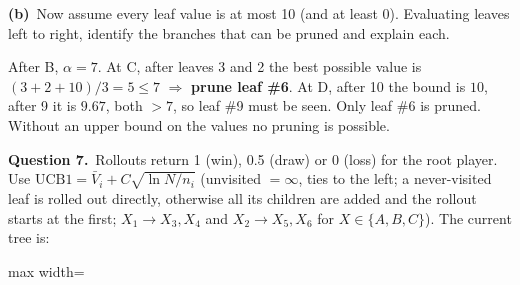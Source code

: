 \documentclass[11pt,a4paper]{article}
\newcommand{\question}[1]{\par\medskip\noindent\textbf{Question #1.}\ }
\newcommand{\subq}[1]{\par\smallskip\noindent\textbf{#1}\ }
\begin{document}
\subq{(b)}Now assume every leaf value is at most 10 (and at least 0). Evaluating leaves left to right, identify the branches that can be pruned and explain each.
\begin{solbox}
After B, $\alpha=7$. At C, after leaves 3 and 2 the best possible value is $(3+2+10)/3=5\le7$ $\Rightarrow$ \textbf{prune leaf \#6}. At D, after 10 the bound is $10$, after 9 it is $9.67$, both $>7$, so leaf \#9 must be seen. Only leaf \#6 is pruned. Without an upper bound on the values no pruning is possible.
\end{solbox}
\question{7}Rollouts return 1 (win), 0.5 (draw) or 0 (loss) for the root player. Use $\mathrm{UCB1}=\bar V_i+C\sqrt{\ln N/n_i}$ (unvisited $=\infty$, ties to the left; a never-visited leaf is rolled out directly, otherwise all its children are added and the rollout starts at the first; $X_1\to X_3,X_4$ and $X_2\to X_5,X_6$ for $X\in\{A,B,C\}$). The current tree is:\begin{center}
\begin{adjustbox}{max width=\linewidth}
\end{adjustbox}
\end{center}
\end{document}

